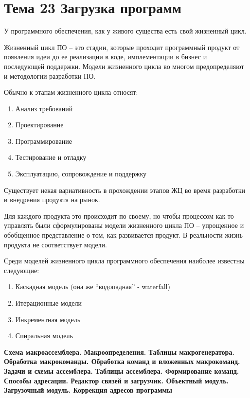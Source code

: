 \newpage 
\chapter{Тема 23 Загрузка программ}

У программного обеспечения, как у живого существа есть свой жизненный цикл.

\begin{opr}
  Жизненный цикл ПО – это стадии, которые проходит программный продукт от появления идеи до ее реализации в коде, имплементации в бизнес и последующей поддержки. Модели жизненного цикла во многом предопределяют и методологии разработки ПО.
\end{opr}

Обычно к этапам жизненного цикла относят:

\begin{enumerate}
  \item Анализ требований
  \item Проектирование
  \item Программирование
  \item Тестирование и отладку
  \item Эксплуатацию, сопровождение и поддержку
\end{enumerate}

Существует некая вариативность в прохождении этапов ЖЦ во время разработки и внедрения продукта на рынок.

\begin{opr}
  Для каждого продукта это происходит по-своему, но чтобы процессом как-то управлять были сформулированы модели жизненного цикла ПО – упрощенное и обобщенное представление о том, как развивается продукт. В реальности жизнь продукта не соответствует модели.
\end{opr}

Среди моделей жизненного цикла программного обеспечения наиболее известны следующие: 

\begin{enumerate}
  \item Каскадная модель (она же “водопадная” - waterfall)
  \item Итерационные модели
  \item Инкрементная модель
  \item Спиральная модель
\end{enumerate}

\begin{center}{\bfseries Схема макроассемблера. Макроопределения. Таблицы макрогенератора. Обработка макрокоманды. Обработка команд и вложенных макрокоманд. Задачи и схемы ассемблера. Таблицы ассемблера. Формирование команд. Способы адресации. Редактор связей и загрузчик. Объектный модуль. Загрузочный модуль. Коррекция адресов программы}
\end{center}

